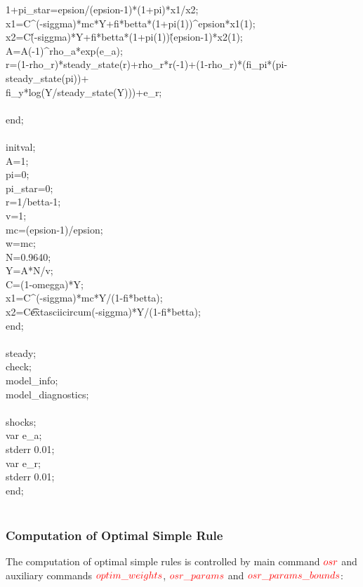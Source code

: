 \documentclass[cn,10pt,math=newtx,citestyle=gb7714-2015,bibstyle=gb7714-2015]{elegantbook}
\begin{document}
{		1+pi\_star=epsion/(epsion-1)*(1+pi)*x1/x2;\\
		x1=C\textasciicircum(-siggma)*mc*Y+fi*betta*(1+pi(1))\textasciicircum epsion*x1(1);\\
		x2=C\^(-siggma)*Y+fi*betta*(1+pi(1))\^(epsion-1)*x2(1);\\
		A=A(-1)\textasciicircum rho\_a*exp(e\_a);\\
		r=(1-rho\_r)*steady\_state(r)+rho\_r*r(-1)+(1-rho\_r)*(fi\_pi*(pi-steady\_state(pi))+\\
		fi\_y*log(Y/steady\_state(Y)))+e\_r;\\
		\\
		end;\\
		\\
		initval;\\
		A=1;\\
		pi=0;\\
		pi\_star=0;\\
		r=1/betta-1;\\
		v=1;\\
		mc=(epsion-1)/epsion;\\
		w=mc;\\
		N=0.9640;\\
		Y=A*N/v;\\
		C=(1-omegga)*Y;\\
		x1=C\textasciicircum(-siggma)*mc*Y/(1-fi*betta);\\
		x2=C\t extasciicircum(-siggma)*Y/(1-fi*betta);\\
		end;\\
		\\
		steady;\\
		check;\\
		model\_info;\\
		model\_diagnostics;\\
		\\
		shocks;\\
		var e\_a;\\
		stderr 0.01;\\
		var e\_r;\\
		stderr 0.01;\\
		end;}\\
	\\
	
	\subsubsection{Computation of Optimal Simple Rule}
	
	The computation of optimal simple rules is controlled by main command $\textcolor{red}{osr}$ and auxiliary commands $\textcolor{red}{optim\_weights}$, $\textcolor{red}{osr\_params}$ and $\textcolor{red}{osr\_params\_bounds}$:
	
\end{document}
